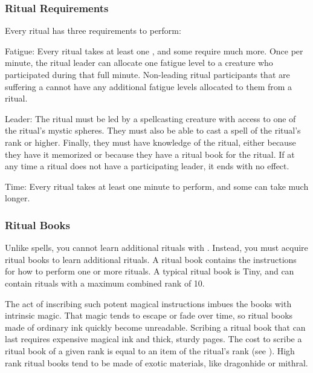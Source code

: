     \subsubsection{Ritual Requirements}\label{Ritual Requirements}
      Every ritual has three requirements to perform:
      \begin{raggeditemize}
        \item Fatigue: Every ritual takes at least one , and some require much more.
          Once per minute, the ritual leader can allocate one fatigue level to a creature who participated during that full minute.
          Non-leading ritual participants that are suffering a  cannot have any additional fatigue levels allocated to them from a ritual.
        \item Leader: The ritual must be led by a spellcasting creature with access to one of the ritual's mystic spheres.
          They must also be able to cast a spell of the ritual's rank or higher.
          Finally, they must have knowledge of the ritual, either because they have it memorized or because they have a ritual book for the ritual.
          If at any time a ritual does not have a participating leader, it ends with no effect.
        \item Time: Every ritual takes at least one minute to perform, and some can take much longer.
      \end{raggeditemize}

    \subsubsection{Ritual Books}\label{Ritual Books}
      Unlike spells, you cannot learn additional rituals with .
      Instead, you must acquire ritual books to learn additional rituals.
      A ritual book contains the instructions for how to perform one or more rituals.
      A typical ritual book is Tiny, and can contain rituals with a maximum combined rank of 10.

      The act of inscribing such potent magical instructions imbues the books with intrinsic magic.
      That magic tends to escape or fade over time, so ritual books made of ordinary ink quickly become unreadable.
      Scribing a ritual book that can last requires expensive magical ink and thick, sturdy pages.
      The cost to scribe a ritual book of a given rank is equal to an item of the ritual's rank (see ).
      High rank ritual books tend to be made of exotic materials, like dragonhide or mithral.

